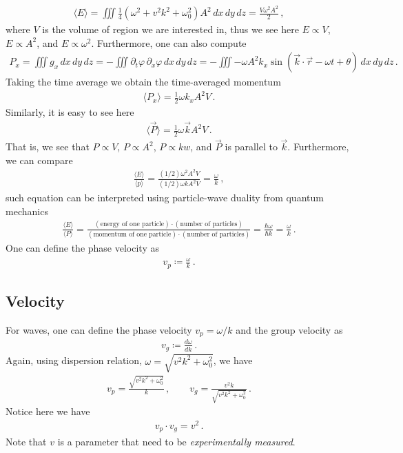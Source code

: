 \documentclass[11pt, onesided]{book}
\theoremstyle{break}
\theoremstyle{break}
\newcommand{\pd}{\partial}
\begin{document}
\begin{align*}
\langle E \rangle = \iiint  \frac{1}{4}\left( \omega^2 + v^2k^2 + \omega_0^2 \right) A^2 \, dx\, dy\, dz =  \frac{V\omega^2A^2}{2}\,,
\end{align*}
where $V$ is the volume of region we are interested in, thus we see here $E \propto V$, $E\propto A^2$, and $E\propto \omega^2$. Furthermore, one can also compute
\begin{align*}
P_x = \iiint g_x\,dx\,dy\,dz = -\iiint \pd_t \varphi\, \pd_x \varphi \,dx\,dy\,dz = -\iiint -\omega A^2 k_x \sin(\vec{k}\cdot \vec{r} - \omega t + \theta)\, dx\,dy\,dz \,.
\end{align*}
Taking the time average we obtain the time-averaged momentum
\begin{align*}
\langle P_x\rangle = \frac{1}{2}\omega k_x A^2 V\,.
\end{align*}
Similarly, it is easy to see here
\begin{align*}
\langle \vec{P}\rangle = \frac{1}{2}\omega\vec{k}A^2 V\,.
\end{align*}
That is, we see that $P\propto V$, $P \propto A^2$, $P\propto kw$, and $\vec{P}$ is parallel to $\vec{k}$. Furthermore, we can compare
\begin{align*}
\frac{\langle E\rangle}{\langle p\rangle} = \frac{ (1/2)\omega^2 A^2V}{(1/2)\omega k A^2 V} = \frac{\omega}{k}\,,
\end{align*}
such equation can be interpreted using particle-wave duality from quantum mechanics
\begin{align*}
\frac{\langle E\rangle}{\langle P\rangle} = \frac{(\text{energy of one particle})\cdot (\text{number of particles})}{(\text{momentum of one particle})\cdot (\text{number of particles})} = \frac{\hbar \omega}{\hbar k} = \frac{\omega }{k}\,.
\end{align*}
One can define the phase velocity as
\begin{align*}
v_p \coloneqq \frac{\omega}{k}\,.
\end{align*}

\subsection{Velocity}
For waves, one can define the phase velocity $v_p = \omega/k$ and the group velocity as
\begin{align*}
v_g \coloneqq \frac{d\omega}{dk}\,.
\end{align*}
Again, using dispersion relation, $\omega = \sqrt{v^2 k^2 + \omega_0^2}$, we have
\begin{align*}
v_p = \frac{\sqrt{v^2 k^2 + \omega_0^2}}{k}\,,\qquad v_g = \frac{v^2k}{\sqrt{v^2 k^2 + \omega_0^2}}\,.
\end{align*}
Notice here we have
\begin{align*}
v_p\cdot v_g = v^2\,.
\end{align*}
Note that $v$ is a parameter that need to be \textit{experimentally measured}.\\
\end{document}
